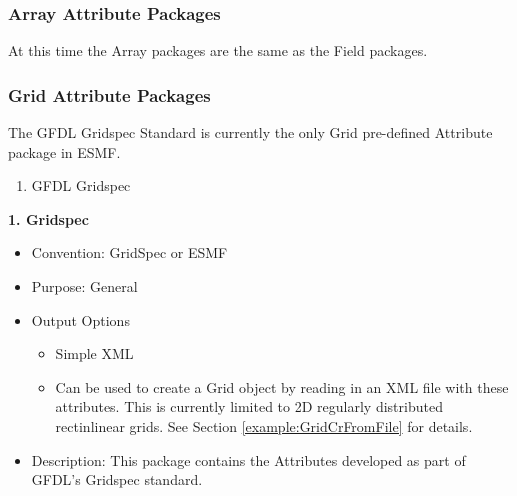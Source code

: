 \vspace{.20in}
\subsubsection{Array Attribute Packages}
\label{ArrayAttributePackages}

At this time the Array packages are the same as the Field packages.


\vspace{.20in}
\subsubsection{Grid Attribute Packages}
\label{GridAttributePackages}

The GFDL Gridspec Standard is currently the only Grid pre-defined Attribute package in ESMF.

\begin{enumerate}
    \item GFDL Gridspec
\end{enumerate}



\vspace{.20in}
{\bf 1. Gridspec}

\label{CIMFieldAttributePackages}

\begin{itemize}
    \item Convention: GridSpec or ESMF
    \item Purpose: General
    \item Output Options
    \begin{itemize}
        \item Simple XML
        \item Can be used to create a Grid object by reading in an XML file with these attributes. This is currently limited to 2D regularly distributed rectinlinear grids. See Section \ref{example:GridCrFromFile} for details. 
    \end{itemize}
    \item Description: This package contains the Attributes developed as part of GFDL's Gridspec standard.
\end{itemize}

